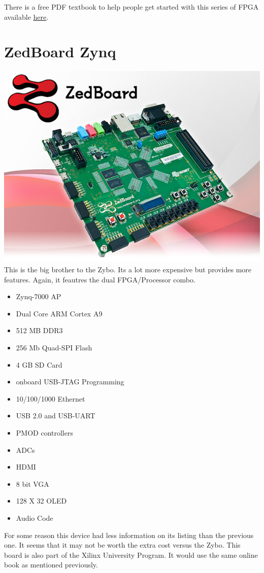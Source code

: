 \documentclass{article}
\begin{document}
	There is a free PDF textbook to help people get started with this series of FPGA available
	\href{http://www.xilinx.com/support/university.html}{here}.

	\newpage
	\section{ZedBoard Zynq}
	\includegraphics[scale=0.5]{ZedBoard}
	This is the big brother to the Zybo. Its a lot more expensive but provides more features. Again, it feautres
	the dual FPGA/Processor combo. 
	\begin{itemize}
	\item Zynq-7000 AP
	\item Dual Core ARM Cortex A9
	\item 512 MB DDR3
	\item 256 Mb Quad-SPI Flash
	\item 4 GB SD Card
	\item onboard USB-JTAG Programming
	\item 10/100/1000 Ethernet
	\item USB 2.0 and USB-UART
	\item PMOD controllers
	\item ADCs
	\item HDMI
	\item 8 bit VGA
	\item 128 X 32 OLED
	\item Audio Code
	\end{itemize}
	
	For some reason this device had less information on its listing than the previous one. It seems that it may 
	not be worth the extra cost versus the Zybo. This board is also part of the Xilinx University Program.
	 It would use the same online book as mentioned previously.
\end{document}
